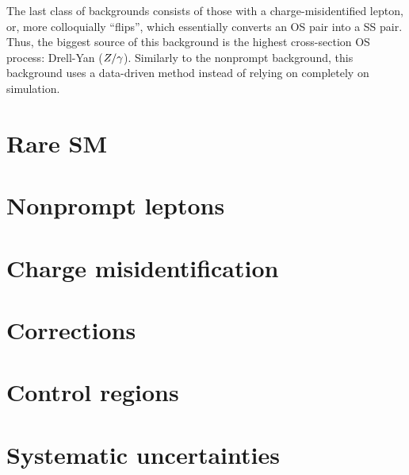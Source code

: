 The last class of backgrounds consists of those with a charge-misidentified lepton, or,
more colloquially ``flips'', which essentially
converts an OS pair into a SS pair. Thus, the biggest source of this background is 
the highest cross-section OS process: Drell-Yan ($Z/\gamma$). Similarly to
the nonprompt background, this background uses a data-driven method instead of 
relying on completely on simulation.

\section{Rare SM}

\section{Nonprompt leptons}

\section{Charge misidentification}

\section{Corrections}

\section{Control regions}

\section{Systematic uncertainties}

